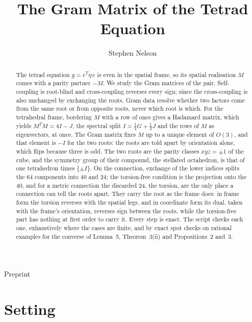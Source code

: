 \documentclass[twocolumn]{iopjournal}
\renewcommand{\articletype}[1]{%
  {\vspace*{-8mm}\noindent \Large \sf Preprint}\par
  \vspace*{6mm}\noindent{\scriptsize \sf{\bfseries \MakeUppercase{#1}}}}
\theoremstyle{definition}
\theoremstyle{remark}
\begin{document}
\articletype{Supplementary Material}

\title{The Gram Matrix of the Tetrad Equation}

\author{Stephen Nelson}



\begin{abstract}
The tetrad equation $g = e^T\eta\,e$ is even in the spatial frame,
so its spatial realisation $M$ comes with a parity partner $-M$. We
study the Gram matrices of the pair. Self-coupling is root-blind and
cross-coupling reverses every sign; since the cross-coupling is also
unchanged by exchanging the roots, Gram data resolve whether two
factors come from the same root or from opposite roots, never which
root is which. For the tetrahedral frame, bordering $M$ with a row of
ones gives a Hadamard matrix, which yields $M^TM = 4I - J$, the
spectral split $I = \tfrac14 G + \tfrac14 J$ and the rows of $M$ as
eigenvectors, at once. The Gram matrix fixes $M$ up to a unique
element of $O(3)$, and that element is $-I$ for the two roots: the
roots are told apart by orientation alone, which flips because three
is odd. The two roots are the parity classes $xyz = \pm1$ of the cube,
and the symmetry group of their compound, the stellated octahedron,
is that of one tetrahedron times $\{\pm I\}$. On the connection,
exchange of the lower indices splits the 64 components into 40 and
24; the torsion-free condition is the projection onto the 40, and for
a metric connection the discarded 24, the torsion, are the only place
a connection can tell the roots apart. They carry the root
as the frame does: in frame form the torsion reverses with the
spatial legs, and in coordinate form its dual, taken with the frame's
orientation, reverses sign between the roots, while the torsion-free
part has nothing at first order to carry it. Every step is exact. The script checks each one, exhaustively where the cases are finite, and by exact spot checks on rational examples for the converse of Lemma~5, Theorem~3(ii) and Propositions~2 and~3.
\end{abstract}



\section*{Setting}
\end{document}

